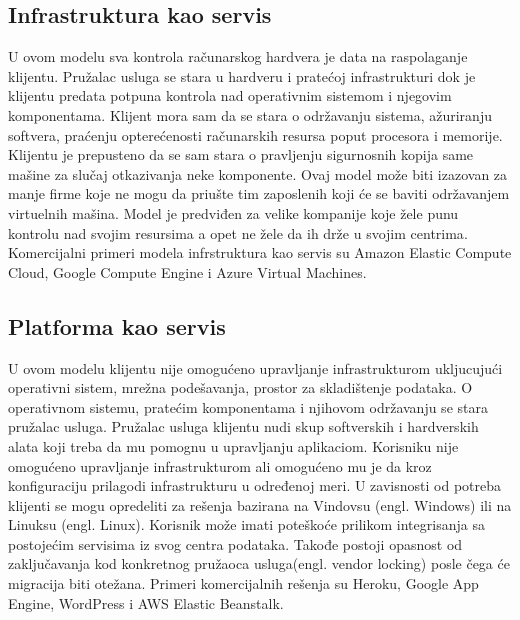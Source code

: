 \documentclass[12pt,oneside]{memoir}
\begin{document}
\subsection{Infrastruktura kao servis}

U ovom modelu sva kontrola računarskog hardvera je data na raspolaganje klijentu. Pružalac usluga se stara u hardveru i pratećoj infrastrukturi dok je klijentu predata potpuna kontrola nad operativnim sistemom i njegovim komponentama. Klijent mora sam da se stara o održavanju sistema, ažuriranju softvera, praćenju opterećenosti računarskih resursa poput procesora i memorije. Klijentu je prepusteno da se sam stara o pravljenju sigurnosnih kopija same mašine za slučaj otkazivanja neke komponente. Ovaj model može biti izazovan za manje firme koje ne mogu da priušte tim zaposlenih koji će se baviti održavanjem virtuelnih mašina. Model je predviđen za velike kompanije koje žele punu kontrolu nad svojim resursima a opet ne žele da ih drže u svojim centrima\cite{cc}. Komercijalni primeri modela infrstruktura kao servis su Amazon Elastic Compute Cloud, Google Compute Engine i Azure Virtual Machines. %

 
\subsection{Platforma kao servis}
U ovom modelu klijentu nije omogućeno upravljanje infrastrukturom ukljucujući operativni sistem, mrežna podešavanja, prostor za skladištenje podataka. O operativnom sistemu, pratećim komponentama i njihovom održavanju se stara pružalac usluga. Pružalac usluga klijentu nudi skup softverskih i hardverskih alata koji treba da mu pomognu u upravljanju aplikaciom. Korisniku nije omogućeno upravljanje infrastrukturom ali omogućeno mu je da kroz konfiguraciju prilagodi infrastrukturu u određenoj meri. U zavisnosti od potreba klijenti se mogu opredeliti za rešenja bazirana na Vindovsu (engl. Windows) ili na Linuksu (engl. Linux). Korisnik može imati poteškoće prilikom integrisanja sa postojećim servisima iz svog centra podataka. Takođe postoji opasnost od zaključavanja kod konkretnog pružaoca usluga(engl. vendor locking) posle čega će migracija biti otežana\cite{cc}. Primeri komercijalnih rešenja su Heroku, Google App Engine, WordPress i AWS Elastic Beanstalk. %
\end{document}
